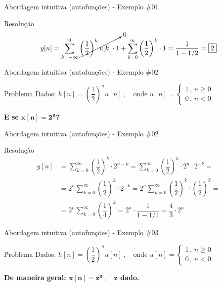 \begin{frame}{Abordagem intuitiva (autofunções) - Exemplo \#01}
\begin{block}{Resolução}
	\[ y[n]=\sum_{k=-\infty}^{0}\cancelto{0}{\left( \dfrac{1}{2}\right)^{k}u[k]\cdot1}+\sum_{k=0}^{\infty}\left( \dfrac{1}{2}\right) ^{k}\cdot 1=\dfrac{1}{1-1/2}=\boxed{2} \]
\end{block}
\end{frame}

\begin{frame}{Abordagem intuitiva (autofunções) - Exemplo \#02}
\begin{center}
	\scalebox{1}{}
\end{center}

\begin{block}{Problema}
	Dados: $ h[n]=\left( \dfrac{1}{2}\right)^{n}u[n]\, ,\quad \text{onde } u[n]=\begin{cases}
	1\, ,\, n\geqslant0\\
	0\, ,\, n<0
	\end{cases}  $
	
	\vspace{0.2cm}
	
	\textbf{E se $ \bm{x[n]=2^{n}} $?}
\end{block}
\end{frame}

\begin{frame}{Abordagem intuitiva (autofunções) - Exemplo \#02}
\begin{block}{Resolução}
	\begin{align*}
	y[n]&=\sum_{k=0}^{\infty}\left(\dfrac{1}{2} \right)^{k}\cdot2^{n-k}= \sum_{k=0}^{\infty}\left(\dfrac{1}{2} \right)^{k}\cdot2^{n}\cdot2^{-k}=\\
	&=2^{n}\sum_{k=0}^{\infty}\left(\dfrac{1}{2} \right)^{k}\cdot2^{-k}=2^{n}\sum_{k=0}^{\infty}\left(\dfrac{1}{2} \right)^{k}\cdot\left( \dfrac{1}{2}\right) ^{k}=\\
	&=2^{n}\sum_{k=0}^{\infty}\left(\dfrac{1}{4} \right)^{k}=2^{n}\cdot\dfrac{1}{1-1/4}=\boxed{\dfrac{4}{3}\cdot2^{n}}
	\end{align*}
\end{block}
\end{frame}

\begin{frame}{Abordagem intuitiva (autofunções) - Exemplo \#03}
\begin{center}
	\scalebox{1}{}
\end{center}

\begin{block}{Problema}
	Dados: $ h[n]=\left( \dfrac{1}{2}\right)^{n}u[n]\, ,\quad \text{onde } u[n]=\begin{cases}
	1\, ,\, n\geqslant0\\
	0\, ,\, n<0
	\end{cases}  $
	
	\vspace{0.2cm}
	
	\textbf{De maneira geral: $ \bm{x[n]=z^{n}\, , \quad z} $ dado.}
\end{block}
\end{frame}

